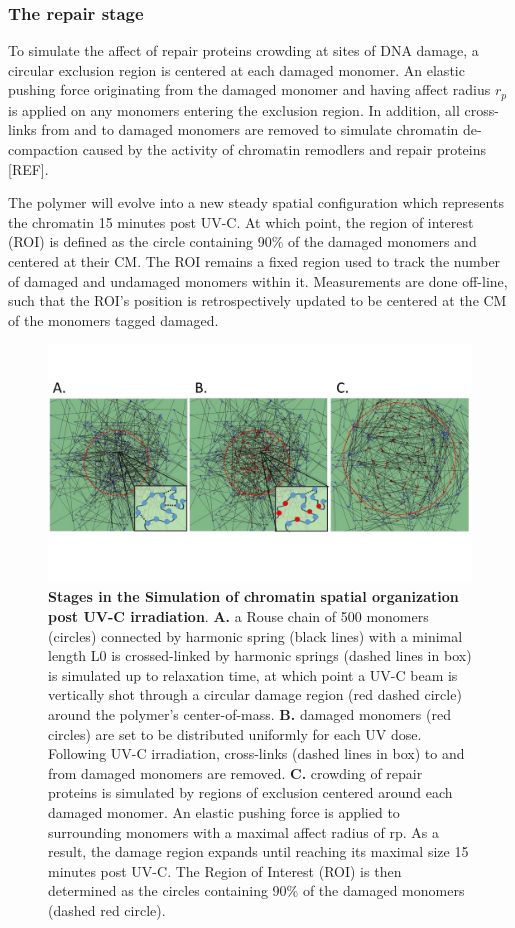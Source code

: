 \documentclass[12pt]{article}
\begin{document}
	\subsubsection{The repair stage}	
	To simulate the affect of repair proteins crowding at sites of DNA damage, a circular exclusion region is centered at each damaged monomer. An elastic pushing force originating from the damaged monomer and having affect radius $r_p$ is applied on any monomers entering the exclusion region. In addition, all cross-links from and to damaged monomers are removed to simulate chromatin de-compaction caused by the activity of chromatin remodlers and repair proteins [REF]. 
	
	The polymer will evolve into a new steady spatial configuration which represents the chromatin 15 minutes post UV-C. At which point, the region of interest (ROI) is defined as the circle containing 90\% of the damaged monomers and centered at their CM. The ROI remains a fixed region used to track the number of damaged and undamaged monomers within it. Measurements are done off-line, such that the ROI's position is retrospectively updated to be centered at the CM of the monomers tagged damaged.
	
\begin{figure}

\includegraphics[width=0.9\linewidth, height=0.35\textheight]{threeStagesOfSimulation}
\caption{\textbf{Stages in the Simulation of chromatin spatial organization post UV-C irradiation}. \textbf{A.} a Rouse chain of 500 monomers (circles) connected by harmonic spring (black lines) with a minimal length L0 is crossed-linked by harmonic springs (dashed lines in box) is simulated up to relaxation time, at which point a UV-C beam is vertically shot through a circular damage region (red dashed circle) around the polymer’s center-of-mass. \textbf{B.}  damaged monomers (red circles) are set to be distributed uniformly for each UV dose. Following UV-C irradiation, cross-links (dashed lines in box) to and from damaged monomers are removed. \textbf{C.} crowding of repair proteins is simulated by regions of exclusion centered around each damaged monomer. An elastic pushing force is applied to surrounding monomers with a maximal affect radius of rp. As a result, the damage region expands until reaching its maximal size 15 minutes post UV-C. The Region of Interest (ROI) is then determined as the circles containing 90\% of the damaged monomers (dashed red circle).}
\label{fig:threeStagesOfSimulation}
\end{figure}
\end{document}
